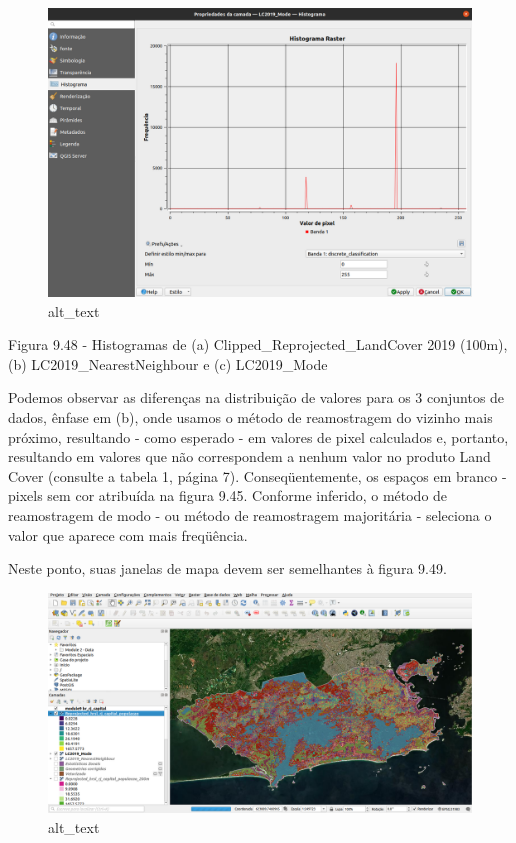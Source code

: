 \documentclass[
  portuguese,
]{krantz}
\begin{document}
\begin{figure}
\centering
\includegraphics{media/modulo9/fig948_c.png}
\caption{alt\_text}
\end{figure}

Figura 9.48 - Histogramas de (a) Clipped\_Reprojected\_LandCover 2019 (100m), (b) LC2019\_NearestNeighbour e (c) LC2019\_Mode

Podemos observar as diferenças na distribuição de valores para os 3 conjuntos de dados, ênfase em (b), onde usamos o método de reamostragem do vizinho mais próximo, resultando - como esperado - em valores de pixel calculados e, portanto, resultando em valores que não correspondem a nenhum valor no produto Land Cover (consulte a tabela 1, página 7). Conseqüentemente, os espaços em branco - pixels sem cor atribuída na figura 9.45. Conforme inferido, o método de reamostragem de modo - ou método de reamostragem majoritária - seleciona o valor que aparece com mais freqüência.

Neste ponto, suas janelas de mapa devem ser semelhantes à figura 9.49.

\begin{figure}
\centering
\includegraphics{media/modulo9/fig949.png}
\caption{alt\_text}
\end{figure}
\end{document}
